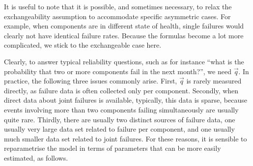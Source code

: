 It is useful to note that it is possible, and sometimes necessary,
to relax the exchangeability assumption
to accommodate specific asymmetric cases.
For example, when components are in different state of health,
single failures would clearly not have identical failure rates.
Because the formulas become a lot more complicated,
we stick to the exchangeable case here.

Clearly, to answer typical reliability questions, such as for instance
``what is the probability that two or more components fail in the next month?'',
we need $\vec{q}$.
In practice, the following three issues commonly arise.
First, $\vec{q}$ is rarely measured directly,
as failure data is often collected only per component.
Secondly, when direct data about joint failures is available,
typically, this data is sparse,
because events involving more than two components failing simultaneously are usually quite rare.
Thirdly, there are usually two distinct sources of failure data,
one usually very large data set related to failure per component,
and one usually much smaller data set related to joint failures.
For these reasons,
it is sensible to reparametrise the model in terms
of parameters that can be more easily estimated, as follows.

